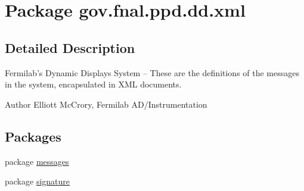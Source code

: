\hypertarget{namespacegov_1_1fnal_1_1ppd_1_1dd_1_1xml}{\section{Package gov.\-fnal.\-ppd.\-dd.\-xml}
\label{namespacegov_1_1fnal_1_1ppd_1_1dd_1_1xml}
}


\subsection{Detailed Description}
Fermilab's Dynamic Displays System -- These are the definitions of the messages in the system, encapsulated in X\-M\-L documents. 

\begin{DoxyAuthor}{Author}
Elliott Mc\-Crory, Fermilab A\-D/\-Instrumentation 
\end{DoxyAuthor}
\subsection*{Packages}
\begin{DoxyCompactItemize}
\item 
package \hyperlink{namespacegov_1_1fnal_1_1ppd_1_1dd_1_1xml_1_1messages}{messages}
\item 
package \hyperlink{namespacegov_1_1fnal_1_1ppd_1_1dd_1_1xml_1_1signature}{signature}
\end{DoxyCompactItemize}
